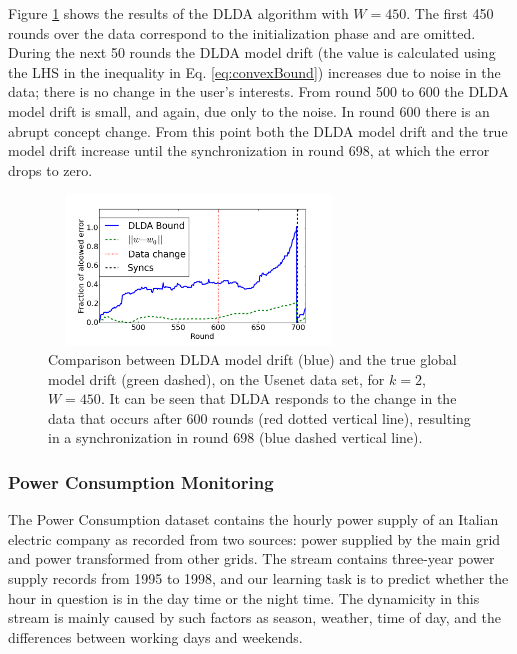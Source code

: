 Figure \ref{usenet} shows the results of the DLDA algorithm with $W=450$. The first 450 rounds over the data correspond to
the initialization phase and are omitted. During the next 50 rounds the DLDA model drift 
(the value is calculated using the LHS in the inequality in Eq. \ref{eq:convexBound}) 
increases due to noise in the data; there is no change in the user's
interests.
From round 500 to 600 the DLDA model drift is small, and again, due only to the noise. In round 600 there is an abrupt concept
change.
From this point both the DLDA model drift and the true model drift increase until the synchronization 
in round 698, at which the error drops to zero. 
\begin{figure}[H]
	\centering
	\includegraphics[width=8cm, height=40mm]{graphics/DriftDetected.png}
	\caption{Comparison between DLDA model drift (blue)
	and the true global model drift (green dashed), on the Usenet data set, for $k=2$, $W=450$. It can be seen that DLDA responds to the change in the data that occurs after 600 rounds (red dotted vertical line), resulting in a synchronization in 
	round 698 (blue dashed vertical line).}
	\label{usenet}
	\end{figure}
	

%
%
\subsubsection{Power Consumption Monitoring}


The Power Consumption dataset  \cite{powerSupply} contains the hourly power supply of an
Italian electric company as recorded from two sources: power supplied
by the main grid and power transformed from other grids.
The stream contains three-year power supply records
from 1995 to 1998, and our learning task is to predict whether the hour 
in question is in the day time or the night time.
The dynamicity in this stream is mainly caused by such factors as season, weather, time of day, and the differences between working days and weekends.




